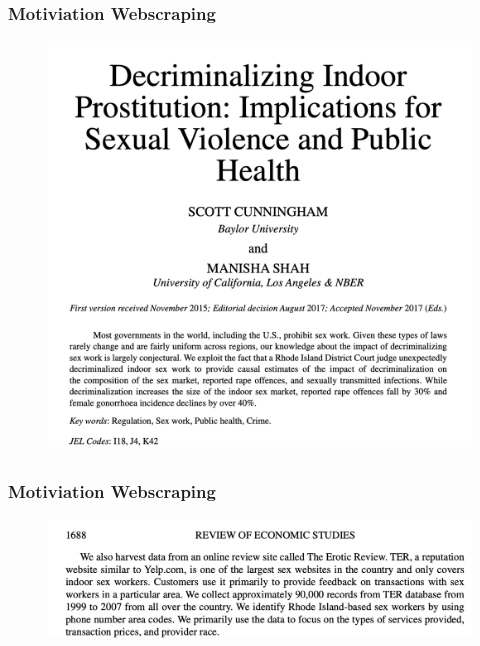 \begin{frame}
\frametitle{Motiviation Webscraping}



\begin{figure}[H] \centering
  \centering
  \includegraphics[scale=0.25]{figures/Cunningham_title}
  \\
  \tiny
\end{figure}
 

\end{frame}


\begin{frame}
\frametitle{Motiviation Webscraping}



\begin{figure}[H] \centering
  \centering
  \includegraphics[scale=0.45]{figures/Cunningham_desc}
  \\
  \tiny
\end{figure}
 

\end{frame}


